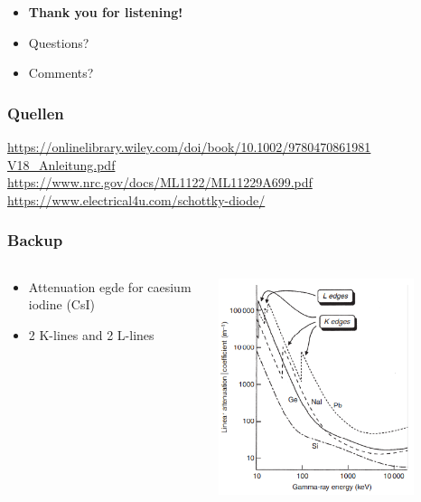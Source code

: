 \documentclass[aspectratio=1610, 12pt]{beamer}
\begin{document}
\begin{frame}
  \begin{itemize}
    \item \textbf{Thank you for listening!}
    \item Questions?
    \item Comments?
  \end{itemize}
\end{frame}

\begin{frame}\frametitle{Quellen}
\url{https://onlinelibrary.wiley.com/doi/book/10.1002/9780470861981} \\
\url{V18_Anleitung.pdf} \\
\url{https://www.nrc.gov/docs/ML1122/ML11229A699.pdf} \\
\url{https://www.electrical4u.com/schottky-diode/} \\
\end{frame}

\begin{frame}\frametitle{Backup}
  \begin{columns}
    \begin{column}[c]{0.45\textwidth}
      \begin{itemize}
        \item Attenuation egde for caesium iodine (CsI)
        \item 2 K-lines and 2 L-lines
      \end{itemize}
    \end{column}
  \begin{column}[c]{0.45\textwidth}
    \includegraphics[width=0.8\textwidth]{plots/attenuation_edges.png}
  \end{column}
  \end{columns}
\end{frame}
\end{document}
